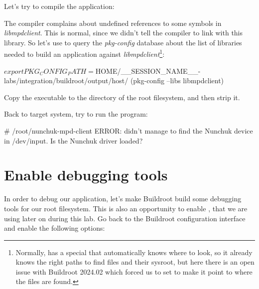 Let's try to compile the application:
\begin{bashinput}
$ %
\end{bashinput}
The compiler complains about undefined references to some symbols in
{\em libmpdclient}. This is normal, since we didn't tell the compiler
to link with this library. So let's use  to query the
{\em pkg-config} database about the list of libraries needed to build
an application against {\em libmpdclient}\footnote{Normally,
 has a special  that
automatically knows where to look, so it already knows the right paths
to find  files and their sysroot, but here there is an open
issue with Buildroot 2024.02 which forced us to set
 to make it point to where the 
files are found.}:

\begin{bashinput}
$ export PKG_CONFIG_PATH=$HOME/__SESSION_NAME__-labs/integration/buildroot/output/host/%
$ %
$(pkg-config --libs libmpdclient)
\end{bashinput}

Copy the  executable to the  directory
of the root filesystem, and then strip it.

Back to target system, try to run the program:

\begin{bashinput}
# /root/nunchuk-mpd-client
ERROR: didn't manage to find the Nunchuk device in /dev/input. Is the Nunchuk driver loaded?
\end{bashinput}

\section{Enable debugging tools}

In order to debug our application, let's make Buildroot build some
debugging tools for our root filesystem. This is also an opportunity to
enable , that we are using later on during this lab. Go back to
the Buildroot configuration interface and enable the following options:

